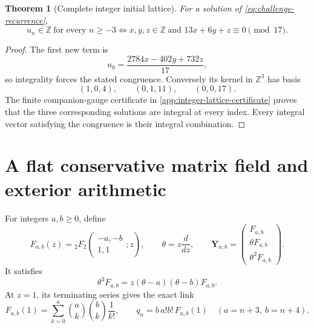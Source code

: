 \documentclass[11pt]{article}
\newtheorem{theorem}{Theorem}[section]
\theoremstyle{definition}
\theoremstyle{remark}
\newcommand{\Z}{\mathbb Z}
\begin{document}
\begin{theorem}[Complete integer initial lattice]
\label{thm:ram-integer-lattice}
For a solution of \eqref{eq:challenge-recurrence},
\begin{equation}\label{eq:integer-lattice}
 \boxed{\displaystyle
 u_n\in\Z\ \text{for every }n\ge-3
 \Longleftrightarrow
 x,y,z\in\Z\ \text{and }13x+6y+z\equiv0\pmod{17}.}
\end{equation}
\end{theorem}

\begin{proof}
The first new term is
\begin{equation}\label{eq:u0-congruence}
 u_0=\frac{2784x-402y+732z}{17},
\end{equation}
so integrality forces the stated congruence.  Conversely its kernel in
\(\Z^3\) has basis
\[
 (1,0,4),\qquad(0,1,11),\qquad(0,0,17).
\]
The finite companion-gauge certificate in
\cref{app:integer-lattice-certificate} proves that the three corresponding
solutions are integral at every index.  Every integral vector satisfying the
congruence is their integral combination.
\end{proof}

\section{A flat conservative matrix field and exterior arithmetic}
\label{sec:cmf}

For integers \(a,b\ge0\), define
\begin{equation}\label{eq:Fab}
 F_{a,b}(z)={}_{2}F_{2}
 \!\left(\begin{matrix}-a,-b\\1,1\end{matrix};z\right),
 \qquad
 \theta=z\frac d{dz},
 \qquad
 \mathbf Y_{a,b}=
 \begin{pmatrix}F_{a,b}\\ \theta F_{a,b}\\ \theta^2F_{a,b}\end{pmatrix}.
\end{equation}
It satisfies
\begin{equation}\label{eq:Fab-ode}
 \theta^3F_{a,b}=z(\theta-a)(\theta-b)F_{a,b}.
\end{equation}
At \(z=1\), its terminating series gives the exact link
\begin{equation}\label{eq:q-Fab-link}
 F_{a,b}(1)=\sum_{k=0}^{a}\binom ak\binom bk\frac1{k!},
 \qquad q_n=b\,a!b!\,F_{a,b}(1)\quad(a=n+3,\ b=n+4).
\end{equation}
\end{document}
